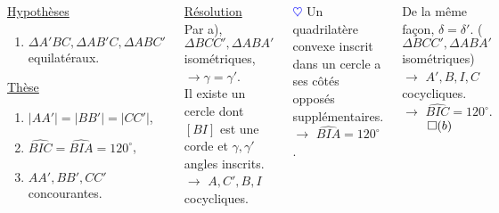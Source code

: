 \documentclass[10pt]{beamer}
\def \heart {\textcolor{blue}{$\heartsuit$} }
\def \deg {^{\circ}}
\begin{document}
{\begin{columns}[t]
\begin{figure}[h]
\begin{tikzpicture}[scale=0.5]
				  \end{tikzpicture}
				  \end{figure}
				  \vspace{-3mm}
				  \begin{tcolorbox}[basic] 
				      
				    \smallskip
				    \underline{Hypothèses} 
				    \begin{enumerate}
				    \item $\Delta A'BC,\Delta AB'C,\Delta ABC'$ equilatéraux.
				    \end{enumerate}
							      
				    \underline{Thèse}
				    \renewcommand{\theenumi}{\alph{enumi})}
				    \begin{enumerate}
				    \item $|AA'|=|BB'| = |CC'|$,
				    \item $\widehat{BIC}=\widehat{BIA}=120\deg$,
				    \item $AA',BB',CC'$ concourantes.
				    \end{enumerate}

				    \end{tcolorbox}
		
		
		\centering
		
		\underline{Résolution}\\ \flushleft
		\onslide<+->Par a), \\ \smallskip 
		$\Delta BCC', \Delta ABA'$ isométriques, \\ \smallskip
		$\rightarrow \gamma = \gamma '$.  \\ \medskip
		Il existe un cercle dont $[BI]$ est une corde et $\gamma,\gamma '$ angles inscrits. \\
		$\rightarrow$ $A,C',B,I$ cocycliques. \\ \medskip
		
		\heart Un quadrilatère convexe inscrit dans un cercle a ses côtés opposés supplémentaires. \\ \medskip
		$\rightarrow$ $\widehat{BIA}=120\deg$. \\ \bigskip
		
		\onslide<+-> De la même façon,
		$\delta = \delta '$. ($\Delta BCC', \Delta ABA'$ isométriques) \\ \medskip
		$\rightarrow$ $A',B,I,C$ cocycliques. \\ \medskip
		$\rightarrow$ $\widehat{BIC}=120\deg$. \hfill $\qed(b)$
		

\end{columns}}
\end{document}
